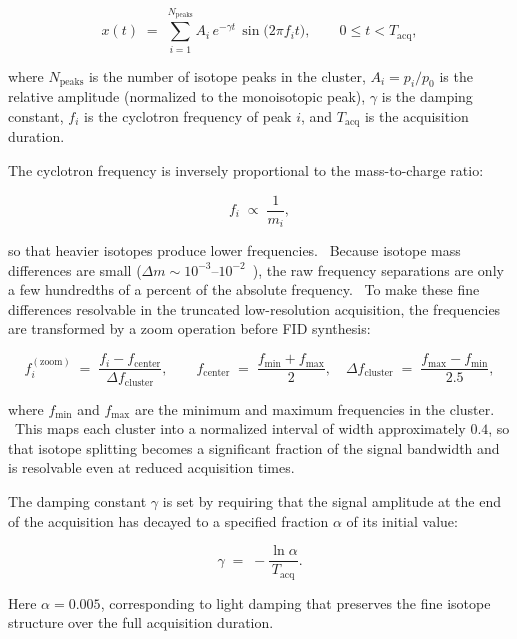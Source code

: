 \documentclass[12pt,a4paper]{report}
\begin{document}
\begin{equation}
x(t) \;=\; \sum_{i=1}^{N_{\mathrm{peaks}}}
A_i \, e^{-\gamma t} \, \sin\!\bigl(2\pi f_i t\bigr),
\qquad
0 \le t < T_{\mathrm{acq}},
\label{eq:fid_model}
\end{equation}

where $N_{\mathrm{peaks}}$ is the number of isotope peaks in the cluster,
$A_i = p_i / p_0$ is the relative amplitude (normalized to the monoisotopic
peak), $\gamma$ is the damping constant, $f_i$ is the cyclotron frequency of
peak $i$, and $T_{\mathrm{acq}}$ is the acquisition duration.

The cyclotron frequency is inversely proportional to the mass-to-charge ratio:

\begin{equation}
f_i \;\propto\; \frac{1}{m_i},
\label{eq:cyclotron_freq}
\end{equation}

so that heavier isotopes produce lower frequencies.  Because isotope mass
differences are small ($\Delta m \sim 10^{-3}$--$10^{-2}$~\ce{}), the raw
frequency separations are only a few hundredths of a percent of the absolute
frequency.  To make these fine differences resolvable in the truncated
low-resolution acquisition, the frequencies are transformed by a zoom operation
before FID synthesis:

\begin{equation}
f_i^{\mathrm{(zoom)}} \;=\;
\frac{f_i - f_{\mathrm{center}}}{\Delta f_{\mathrm{cluster}}},
\qquad
f_{\mathrm{center}} \;=\; \frac{f_{\min}+f_{\max}}{2},
\quad
\Delta f_{\mathrm{cluster}} \;=\;
\frac{f_{\max} - f_{\min}}{2.5},
\label{eq:freq_zoom}
\end{equation}

where $f_{\min}$ and $f_{\max}$ are the minimum and maximum frequencies in the
cluster.  This maps each cluster into a normalized interval of width
approximately $0.4$, so that isotope splitting becomes a significant fraction of
the signal bandwidth and is resolvable even at reduced acquisition times.

The damping constant $\gamma$ is set by requiring that the signal amplitude at
the end of the acquisition has decayed to a specified fraction $\alpha$ of its
initial value:

\begin{equation}
\gamma \;=\; -\frac{\ln \alpha}{T_{\mathrm{acq}}}.
\label{eq:damping}
\end{equation}

Here $\alpha = 0.005$, corresponding to light damping that preserves the fine
isotope structure over the full acquisition duration.
\end{document}

